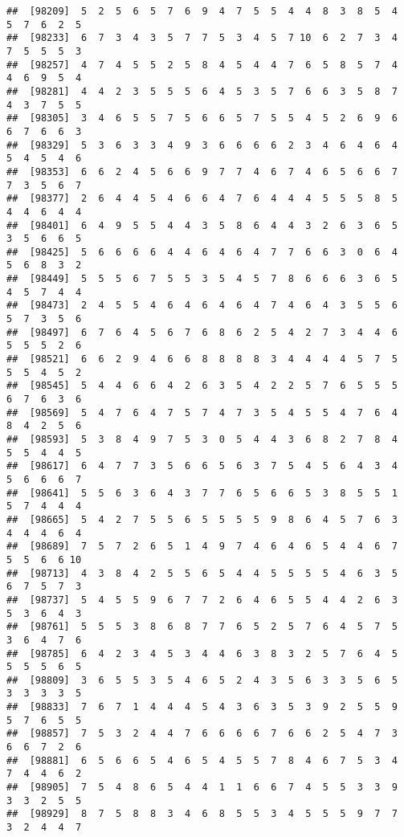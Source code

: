 \documentclass[
]{book}
\begin{document}
\begin{verbatim}
##  [98209]  5  2  5  6  5  7  6  9  4  7  5  5  4  4  8  3  8  5  4  5  7  6  2  5
##  [98233]  6  7  3  4  3  5  7  7  5  3  4  5  7 10  6  2  7  3  4  7  5  5  5  3
##  [98257]  4  7  4  5  5  2  5  8  4  5  4  4  7  6  5  8  5  7  4  4  6  9  5  4
##  [98281]  4  4  2  3  5  5  5  6  4  5  3  5  7  6  6  3  5  8  7  4  3  7  5  5
##  [98305]  3  4  6  5  5  7  5  6  6  5  7  5  5  4  5  2  6  9  6  6  7  6  6  3
##  [98329]  5  3  6  3  3  4  9  3  6  6  6  6  2  3  4  6  4  6  4  5  4  5  4  6
##  [98353]  6  6  2  4  5  6  6  9  7  7  4  6  7  4  6  5  6  6  7  7  3  5  6  7
##  [98377]  2  6  4  4  5  4  6  6  4  7  6  4  4  4  5  5  5  8  5  4  4  6  4  4
##  [98401]  6  4  9  5  5  4  4  3  5  8  6  4  4  3  2  6  3  6  5  3  5  6  6  5
##  [98425]  5  6  6  6  6  4  4  6  4  6  4  7  7  6  6  3  0  6  4  5  6  8  3  2
##  [98449]  5  5  5  6  7  5  5  3  5  4  5  7  8  6  6  6  3  6  5  4  5  7  4  4
##  [98473]  2  4  5  5  4  6  4  6  4  6  4  7  4  6  4  3  5  5  6  5  7  3  5  6
##  [98497]  6  7  6  4  5  6  7  6  8  6  2  5  4  2  7  3  4  4  6  5  5  5  2  6
##  [98521]  6  6  2  9  4  6  6  8  8  8  8  3  4  4  4  4  5  7  5  5  5  4  5  2
##  [98545]  5  4  4  6  6  4  2  6  3  5  4  2  2  5  7  6  5  5  5  6  7  6  3  6
##  [98569]  5  4  7  6  4  7  5  7  4  7  3  5  4  5  5  4  7  6  4  8  4  2  5  6
##  [98593]  5  3  8  4  9  7  5  3  0  5  4  4  3  6  8  2  7  8  4  5  5  4  4  5
##  [98617]  6  4  7  7  3  5  6  6  5  6  3  7  5  4  5  6  4  3  4  5  6  6  6  7
##  [98641]  5  5  6  3  6  4  3  7  7  6  5  6  6  5  3  8  5  5  1  5  7  4  4  4
##  [98665]  5  4  2  7  5  5  6  5  5  5  5  9  8  6  4  5  7  6  3  4  4  4  6  4
##  [98689]  7  5  7  2  6  5  1  4  9  7  4  6  4  6  5  4  4  6  7  5  5  6  6 10
##  [98713]  4  3  8  4  2  5  5  6  5  4  4  5  5  5  5  4  6  3  5  6  7  5  7  3
##  [98737]  5  4  5  5  9  6  7  7  2  6  4  6  5  5  4  4  2  6  3  5  3  6  4  3
##  [98761]  5  5  5  3  8  6  8  7  7  6  5  2  5  7  6  4  5  7  5  3  6  4  7  6
##  [98785]  6  4  2  3  4  5  3  4  4  6  3  8  3  2  5  7  6  4  5  5  5  5  6  5
##  [98809]  3  6  5  5  3  5  4  6  5  2  4  3  5  6  3  3  5  6  5  3  3  3  3  5
##  [98833]  7  6  7  1  4  4  4  5  4  3  6  3  5  3  9  2  5  5  9  5  7  6  5  5
##  [98857]  7  5  3  2  4  4  7  6  6  6  6  7  6  6  2  5  4  7  3  6  6  7  2  6
##  [98881]  6  5  6  6  5  4  6  5  4  5  5  7  8  4  6  7  5  3  4  7  4  4  6  2
##  [98905]  7  5  4  8  6  5  4  4  1  1  6  6  7  4  5  5  3  3  9  3  3  2  5  5
##  [98929]  8  7  5  8  8  3  4  6  8  5  5  3  4  5  5  5  9  7  7  3  2  4  4  7

\end{verbatim}
\end{document}
